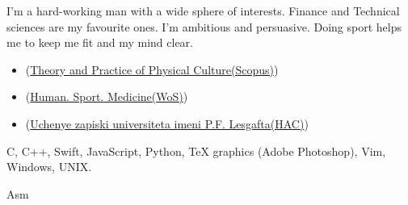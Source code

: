 I’m a hard-working man with a wide sphere of interests. Finance and Technical sciences are my favourite ones. I’m ambitious and persuasive. Doing sport helps me to keep me fit and my mind clear.




\begin{itemize}
\item {}
(\href{http://www.teoriya.ru/en/node/6658}{Theory and Practice of Physical Culture(Scopus)})
\item {}
(\href{https://hsm.susu.ru/hsm/article/view/286}{Human. Sport. Medicine(WoS)})
\item {}
(\href{http://lesgaft-notes.spb.ru/ru/node/11144}{Uchenye zapiski universiteta imeni P.F. Lesgafta(HAC)})
\end{itemize}







C, C++, Swift, JavaScript, Python, TeX
graphics (Adobe Photoshop), Vim, Windows, UNIX.

Asm